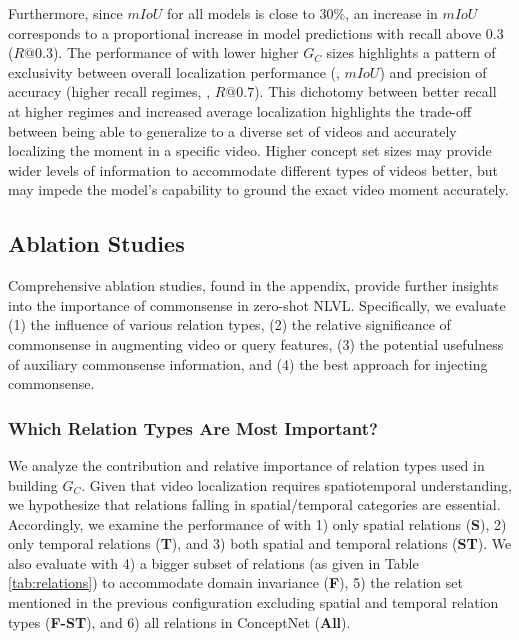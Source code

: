 Furthermore, since \(mIoU\) for all models is close to 30\%, an increase in  \(mIoU\) corresponds to a proportional increase in model predictions with recall above 0.3 (\(R@0.3\)).
The performance of \modelname with lower \vs higher $G_{C}$ sizes highlights a pattern of exclusivity between overall localization performance (\ie, \(mIoU\)) and precision of accuracy (higher recall regimes, \eg, \(R@0.7\)). This dichotomy between better recall at higher regimes and increased average localization highlights the trade-off between being able to generalize to a diverse set of videos and accurately localizing the moment in a specific video. Higher concept set sizes may provide wider levels of information to accommodate different types of videos better, but may impede the model's capability to ground the exact video moment accurately. 


\subsection{Ablation Studies}
\label{sec:ablation}
Comprehensive ablation studies, found in the appendix, provide further insights into the importance of commonsense in zero-shot NLVL. Specifically, we evaluate (1) the influence of various relation types, (2) the relative significance of commonsense in augmenting video or query features, (3) the potential usefulness of auxiliary commonsense information, and (4) the best approach for injecting commonsense. 



\subsubsection{Which Relation Types Are Most Important?}
We analyze the contribution and relative importance of relation types used in building \(G_{C}\). Given that video localization requires spatiotemporal understanding, we hypothesize that relations falling in spatial/temporal categories are essential. Accordingly, we examine the performance of \modelname with 1) only spatial relations (\textbf{S}), 2) only temporal relations (\textbf{T}), and 3) both spatial and temporal relations (\textbf{ST}). We also evaluate \modelname with 4) a bigger subset of relations (as given in Table \ref{tab:relations}) to accommodate domain invariance (\textbf{F}), 5) the relation set mentioned in the previous configuration excluding spatial and temporal relation types (\textbf{F-ST}), and 6) all relations in ConceptNet (\textbf{All}). 

